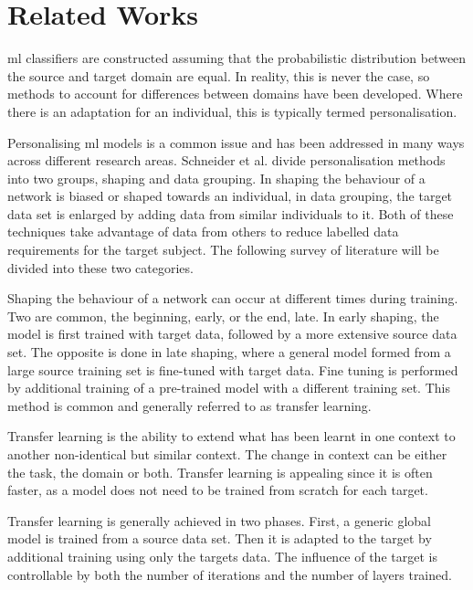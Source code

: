 \section{Related Works} %
\label{sec:personalisation-related-works}
\acrshort{ml} classifiers are constructed assuming that the probabilistic distribution between the source and target domain are equal\cite{Farahani2020}. In reality, this is never the case, so methods to account for differences between domains have been developed. Where there is an adaptation for an individual, this is typically termed personalisation.

Personalising \acrshort{ml} models is a common issue and has been addressed in many ways across different research areas\cite{Mairittha2021, Tomanek2021}. Schneider et al. divide personalisation methods into two groups, shaping and data grouping\cite{Schneider2021}. In shaping the behaviour of a network is biased or shaped towards an individual, in data grouping, the target data set is enlarged by adding data from similar individuals to it. Both of these techniques take advantage of data from others to reduce labelled data requirements for the target subject\cite{Shor2020}. The following survey of literature will be divided into these two categories. 

Shaping the behaviour of a network can occur at different times during training. Two are common, the beginning, early, or the end, late. In early shaping, the model is first trained with target data, followed by a more extensive source data set. The opposite is done in late shaping, where a general model formed from a large source training set is fine-tuned with target data. Fine tuning is performed by additional training of a pre-trained model with a different training set. This method is common and generally referred to as transfer learning.\cite{Schneider2021}

Transfer learning is the ability to extend what has been learnt in one context to another non-identical but similar context\cite{Fallahzadeh2017}. The change in context can be either the task, the domain or both. Transfer learning is appealing since it is often faster, as a model does not need to be trained from scratch for each target. 

Transfer learning is generally achieved in two phases. First, a generic global model is trained from a source data set. Then it is adapted to the target by additional training using only the targets data. The influence of the target is controllable by both the number of iterations and the number of layers trained.\cite{Schneider2021, Mireshghallah2021}

